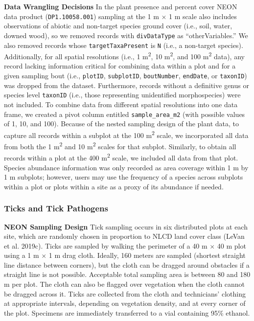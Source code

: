 \documentclass[
  12pt,
]{article}
\begin{document}
\textbf{Data Wrangling Decisions} In the plant presence and percent cover NEON data product (\texttt{DP1.10058.001}) sampling at the 1 m \(\times\) 1 m scale also includes observations of abiotic and non-target species ground cover (i.e., soil, water, downed wood), so we removed records with \texttt{divDataType} as ``otherVariables.'' We also removed records whose \texttt{targetTaxaPresent} is \texttt{N} (i.e., a non-target species). Additionally, for all spatial resolutions (i.e., 1 m\textsuperscript{2}, 10 m\textsuperscript{2}, and 100 m\textsuperscript{2} data), any record lacking information critical for combining data within a plot and for a given sampling bout (i.e., \texttt{plotID}, \texttt{subplotID}, \texttt{boutNumber}, \texttt{endDate}, or \texttt{taxonID}) was dropped from the dataset. Furthermore, records without a definitive genus or species level \texttt{taxonID} (i.e., those representing unidentified morphospecies) were not included. To combine data from different spatial resolutions into one data frame, we created a pivot column entitled \texttt{sample\_area\_m2} (with possible values of 1, 10, and 100). Because of the nested sampling design of the plant data, to capture all records within a subplot at the 100 m\textsuperscript{2} scale, we incorporated all data from both the 1 m\textsuperscript{2} and 10 m\textsuperscript{2} scales for that subplot. Similarly, to obtain all records within a plot at the 400 m\textsuperscript{2} scale, we included all data from that plot. Species abundance information was only recorded as area coverage within 1 m by 1 m subplots; however, users may use the frequency of a species across subplots within a plot or plots within a site as a proxy of its abundance if needed.

\hypertarget{ticks-and-tick-pathogens}{%
\subsubsection{Ticks and Tick Pathogens}\label{ticks-and-tick-pathogens}}

\textbf{NEON Sampling Design} Tick sampling occurs in six distributed plots at each site, which are randomly chosen in proportion to NLCD land cover class (LeVan et al. 2019c). Ticks are sampled by walking the perimeter of a 40 m \(\times\) 40 m plot using a 1 m \(\times\) 1 m drag cloth. Ideally, 160 meters are sampled (shortest straight line distance between corners), but the cloth can be dragged around obstacles if a straight line is not possible. Acceptable total sampling area is between 80 and 180 m per plot. The cloth can also be flagged over vegetation when the cloth cannot be dragged across it. Ticks are collected from the cloth and technicians' clothing at appropriate intervals, depending on vegetation density, and at every corner of the plot. Specimens are immediately transferred to a vial containing 95\% ethanol.
\end{document}
